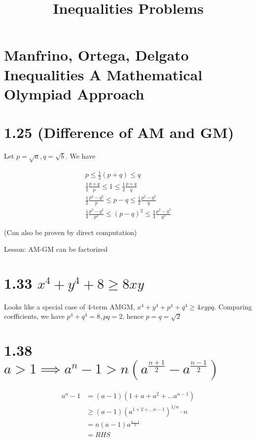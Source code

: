 \documentclass{article}
\title{Inequalities Problems}
\date{}
\def\f12{\frac{1}{2}}
\begin{document}
\maketitle

\section*{Manfrino, Ortega, Delgato Inequalities A Mathematical Olympiad Approach}

\section*{1.25 (Difference of AM and GM)}

Let $p = \sqrt{a}, q = \sqrt{b}$. We have

\begin{align*}
p \le \f12(p+q) \le q \\
\f12 \frac{p+q}{p} \le 1 \le \f12 \frac{p+q}{q} \\
\f12 \frac{p^2 - q^2}{p} \le p-q \le \f12 \frac{p^2 - q^2}{q} \\
\frac{1}{4} \frac{p^2 - q^2}{p^2} \le (p-q)^2 \le \frac{1}{4} \frac{p^2 - q^2}{q^2}
\end{align*}

(Can also be proven by direct computation)

Lesson: AM-GM can be factorized

\section*{1.33 $x^4 + y^4 + 8 \ge 8xy$}

Looks like a special case of 4-term AMGM, $x^4 + y^4 + p^4 + q^4 \ge 4xypq$. Comparing coefficients, we have $p^4 + q^4 = 8, pq = 2$, hence $p = q = \sqrt 2$

\section*{1.38 $a > 1 \implies a^n-1 > n (a^{\frac{n+1}{2}} - a^{\frac{n-1}{2}})$}

\begin{align*}
a^n - 1 &= (a-1) (1 + a + a^2 + \ldots a^{n-1}) \\
&\ge (a-1) (a ^ {1 + 2 + \ldots n-1})^{1/n} \cdot n \\
&= n (a-1) a^\frac{n-1}{2} \\
&= RHS
\end{align*}
\end{document}
